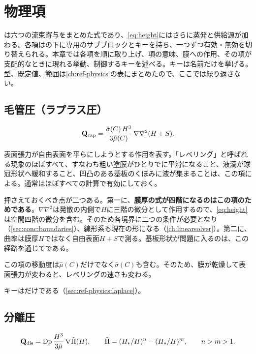 \chapter{物理項}
\label{ch:terms}

は六つの流束寄与をまとめた式であり、\cref{eq:height}にはさらに蒸発と供給源が加わる。各項はの下に専用のサブブロックとキーを持ち、一つずつ有効・無効を切り替えられる。本章では各項を順に取り上げ、項の意味、膜への作用、その項が支配的なときに現れる挙動、制御するキーを述べる。キーは名前だけを挙げる。型、既定値、範囲は\cref{ch:ref-physics}の表にまとめたので、ここでは繰り返さない。

\section{毛管圧（ラプラス圧）}
\label{sec:terms:laplace}

\begin{equation}\label{eq:q-cap}
  \mathbf{Q}_{\mathrm{cap}}
    = \frac{\hat{\sigma}(C)\,H^{3}}{3\hat{\mu}(C)}\,\nabla\nabla^{2}(H+S).
\end{equation}

表面張力が自由表面を平らにしようとする作用を表す。「レベリング」と呼ばれる現象のほぼすべて、すなわち粗い塗膜がひとりでに平滑になること、液滴が球冠形状へ緩和すること、凹凸のある基板のくぼみに液が集まることは、この項による。通常はほぼすべての計算で有効にしておく。

押さえておくべき点が二つある。第一に、\textbf{膜厚の式が四階になるのはこの項のためである}。$\nabla\nabla^{2}$は発散の内側で$H$に三階の微分として作用するので、\cref{eq:height}は空間四階の微分を含む。そのため各境界に二つの条件が必要となり（\cref{sec:conc:boundaries}）、線形系も現在の形になる（\cref{ch:linearsolver}）。第二に、曲率は膜厚$H$ではなく自由表面$H+S$で測る。基板形状が問題に入るのは、この経路を通じてである。

この項の移動度は$\hat{\mu}(C)$だけでなく$\hat{\sigma}(C)$も含む。そのため、膜が乾燥して表面張力が変わると、レベリングの速さも変わる。

キーはだけである（\cref{sec:ref-physics:laplace}）。

\section{分離圧}
\label{sec:terms:disjoining}

\begin{equation}\label{eq:q-dis}
  \mathbf{Q}_{\mathrm{dis}} = \mathrm{Dp}\,\frac{H^{3}}{3\hat{\mu}}\,\nabla\hat{\Pi}(H),
  \qquad
  \hat{\Pi} = (H_{*}/H)^{n} - (H_{*}/H)^{m},
  \qquad n > m > 1.
\end{equation}

